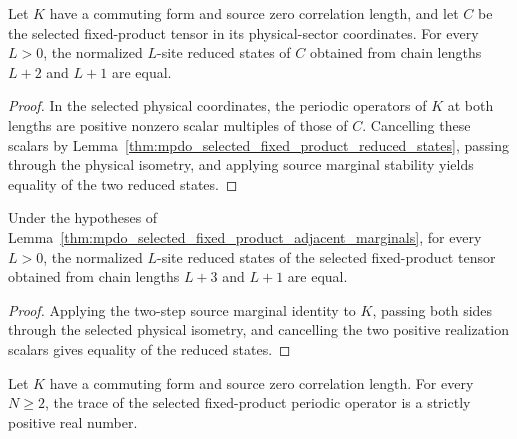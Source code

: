 \begin{lemma}
    \label{thm:mpdo_selected_fixed_product_adjacent_marginals}
    \leanok
    Let $K$ have a commuting form and source zero correlation length,
    and let $C$ be the selected fixed-product tensor in its physical-sector
    coordinates. For every $L>0$, the normalized $L$-site reduced states of
    $C$ obtained from chain lengths $L+2$ and $L+1$ are equal.
\end{lemma}

\begin{proof}\leanok
    In the selected physical coordinates, the periodic operators of $K$ at
    both lengths are positive nonzero scalar multiples of those of $C$.
    Cancelling these scalars by
    Lemma~\ref{thm:mpdo_selected_fixed_product_reduced_states}, passing
    through the physical isometry, and applying source marginal stability
    yields equality of the two reduced states.
\end{proof}

\begin{lemma}
    \label{thm:mpdo_selected_fixed_product_iterated_marginals}
    \leanok
    Under the hypotheses of
    Lemma~\ref{thm:mpdo_selected_fixed_product_adjacent_marginals}, for every
    $L>0$, the normalized $L$-site reduced states of the selected fixed-product
    tensor obtained from chain lengths $L+3$ and $L+1$ are equal.
\end{lemma}

\begin{proof}\leanok
    Applying the two-step source marginal identity to $K$, passing both sides
    through the selected physical isometry, and cancelling the two positive
    realization scalars gives equality of the reduced states.
\end{proof}

\begin{lemma}
    \label{thm:mpdo_selected_fixed_product_positive_traces}
    \leanok
    Let $K$ have a commuting form and source zero correlation length.
    For every $N\geq2$, the trace of the selected fixed-product periodic
    operator is a strictly positive real number.
\end{lemma}

